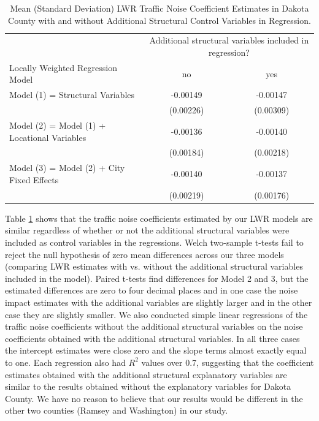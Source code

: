 \documentclass{article}\usepackage{graphicx, color}
\begin{document}
\begin{table}[ht]
\begin{center}
\caption{Mean (Standard Deviation) LWR Traffic Noise Coefficient Estimates in Dakota County with and without Additional Structural Control Variables in Regression.}\label{tab:Dak}
\begin{tabular}{lcc}
 & \multicolumn{2}{p{1.3in}}{Additional structural variables included in regression?} \\
Locally Weighted Regression Model & \multicolumn{1}{c}{no} & \multicolumn{1}{c}{yes} \\ \hline
Model (1) = Structural Variables & -0.00149 & -0.00147 \\ 
   & (0.00226) & (0.00309) \\ 
Model (2) = Model (1) + Locational Variables & -0.00136 & -0.00140 \\ 
   & (0.00184) & (0.00218) \\ 
Model (3) = Model (2) + City Fixed Effects & -0.00140 & -0.00137 \\ 
   & (0.00219) & (0.00176) \\ 
\end{tabular}
\end{center}
\end{table}

Table \ref{tab:Dak} shows that the traffic noise coefficients estimated by our LWR models are similar regardless of whether or not the additional structural variables were included as control variables in the regressions. Welch two-sample t-tests fail to reject the null hypothesis of zero mean differences across our three models (comparing LWR estimates with vs. without the additional structural variables included in the model). Paired t-tests find differences for Model 2 and 3, but the estimated differences are zero to four decimal places and in one case the noise impact estimates with the additional variables are slightly larger and in the other case they are slightly smaller. We also conducted simple linear regressions of the traffic noise coefficients without the additional structural variables on the noise coefficients obtained with the additional structural variables. In all three cases the intercept estimates were close zero and the slope terms almost exactly equal to one. Each regression also had $R^2$ values over 0.7, suggesting that the coefficient estimates obtained with the additional structural explanatory variables are similar to the results obtained without the explanatory variables for Dakota County. We have no reason to believe that our results would be different in the other two counties (Ramsey and Washington) in our study. 
\end{document}
